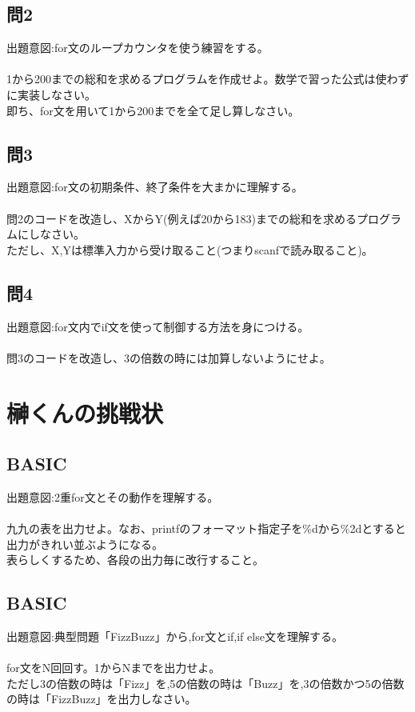 \documentclass[a4j,titlepage,dvipdfmx]{jsarticle}   %
\begin{document}
\begin{itembox}
\begin{itembox}
\subsection{問2}
出題意図:for文のループカウンタを使う練習をする。\\
\\
1から200までの総和を求めるプログラムを作成せよ。数学で習った公式は使わずに実装しなさい。\\
即ち、for文を用いて1から200までを全て足し算しなさい。\\

\subsection{問3}
出題意図:for文の初期条件、終了条件を大まかに理解する。\\
\\
問2のコードを改造し、XからY(例えば20から183)までの総和を求めるプログラムにしなさい。\\
ただし、X,Yは標準入力から受け取ること(つまりscanfで読み取ること)。\\

\subsection{問4}
出題意図:for文内でif文を使って制御する方法を身につける。\\
\\
問3のコードを改造し、3の倍数の時には加算しないようにせよ。\\


\section{榊くんの挑戦状}

\subsection{BASIC}
出題意図:2重for文とその動作を理解する。\\
\\
九九の表を出力せよ。なお、printfのフォーマット指定子を\%dから\%2dとすると出力がきれい並ぶようになる。\\
表らしくするため、各段の出力毎に改行すること。\\

\subsection{BASIC}
出題意図:典型問題「FizzBuzz」から,for文とif,if else文を理解する。\\
\\
for文をN回回す。1からNまでを出力せよ。\\
ただし3の倍数の時は「Fizz」を,5の倍数の時は「Buzz」を,3の倍数かつ5の倍数の時は「FizzBuzz」を出力しなさい。\\


\end{itembox}
\end{itembox}
\end{document}
